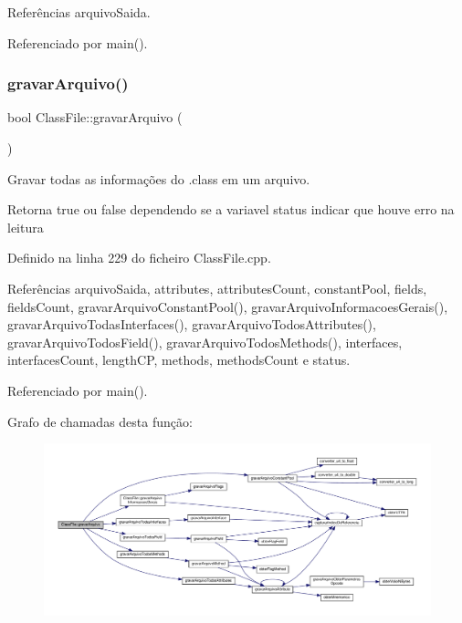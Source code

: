 Referências arquivo\+Saida.



Referenciado por main().

\mbox{\label{classClassFile_a452169cb59d63012f98a34a3fff2c2f7}} 
\subsubsection{\texorpdfstring{gravar\+Arquivo()}{gravarArquivo()}}
{\footnotesize\ttfamily bool Class\+File\+::gravar\+Arquivo (\begin{DoxyParamCaption}{ }\end{DoxyParamCaption})}



Gravar todas as informações do .class em um arquivo. 

\begin{DoxyReturn}{Retorna}
true ou false dependendo se a variavel status indicar que houve erro na leitura 
\end{DoxyReturn}


Definido na linha 229 do ficheiro Class\+File.\+cpp.



Referências arquivo\+Saida, attributes, attributes\+Count, constant\+Pool, fields, fields\+Count, gravar\+Arquivo\+Constant\+Pool(), gravar\+Arquivo\+Informacoes\+Gerais(), gravar\+Arquivo\+Todas\+Interfaces(), gravar\+Arquivo\+Todos\+Attributes(), gravar\+Arquivo\+Todos\+Field(), gravar\+Arquivo\+Todos\+Methods(), interfaces, interfaces\+Count, length\+CP, methods, methods\+Count e status.



Referenciado por main().

Grafo de chamadas desta função\+:
\nopagebreak
\begin{figure}[H]
\begin{center}
\leavevmode
\includegraphics[width=350pt]{classClassFile_a452169cb59d63012f98a34a3fff2c2f7_cgraph}
\end{center}
\end{figure}
\mbox{\label{classClassFile_a4a685afd10dc5aaacd5a71ed535895c6}} 
